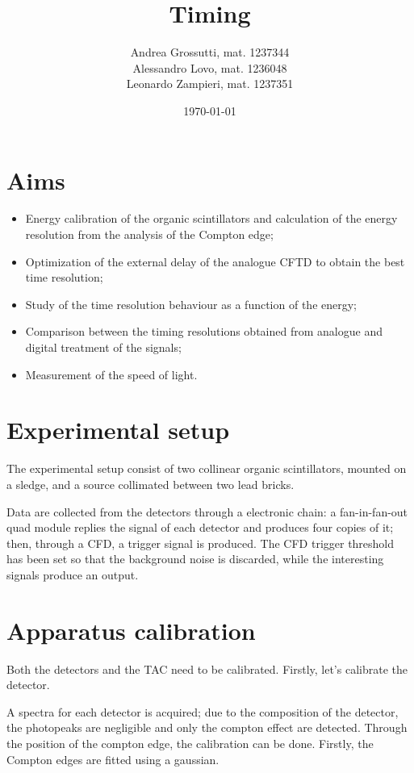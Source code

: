 \documentclass[11pt,a4 paper]{article}
\title{Timing}
\author{Andrea Grossutti, mat. 1237344\\Alessandro Lovo, mat. 1236048\\Leonardo Zampieri, mat. 1237351}
\date{\today}
\begin{document}
\maketitle

\section{Aims}
\begin{itemize}[noitemsep]
    \item Energy calibration of the organic scintillators and calculation of the energy resolution from the analysis of the Compton edge;
    \item Optimization of the external delay of the analogue CFTD to obtain the best time resolution;
    \item Study of the time resolution behaviour as a function of the energy;
    \item Comparison between the timing resolutions obtained from analogue and digital treatment of the signals;
    \item Measurement of the speed of light.
\end{itemize}

\section{Experimental setup}
The experimental setup consist of two collinear organic scintillators, mounted on a sledge, and a  source collimated between two lead bricks.

Data are collected from the detectors through a electronic chain: a fan-in-fan-out quad module replies the signal of each detector and produces four copies of it; then, through a CFD, a trigger signal is produced. The CFD trigger threshold has been set so that the background noise is discarded, while the interesting signals produce an output.

\section{Apparatus calibration}
Both the detectors and the TAC need to be calibrated. Firstly, let's calibrate the detector.

A spectra for each detector is acquired; due to the composition of the detector, the photopeaks are negligible and only the compton effect are detected. Through the position of the compton edge, the calibration can be done. Firstly, the Compton edges are fitted using a gaussian.
\end{document}
